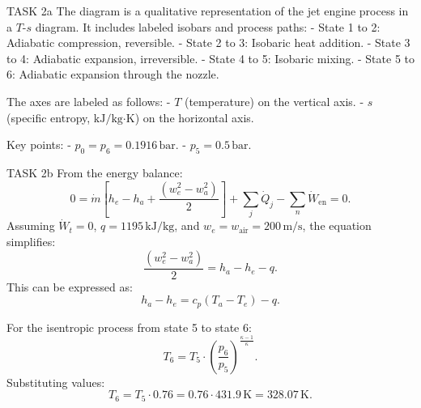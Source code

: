 TASK 2a  
The diagram is a qualitative representation of the jet engine process in a \( T \)-\( s \) diagram. It includes labeled isobars and process paths:  
- State 1 to 2: Adiabatic compression, reversible.  
- State 2 to 3: Isobaric heat addition.  
- State 3 to 4: Adiabatic expansion, irreversible.  
- State 4 to 5: Isobaric mixing.  
- State 5 to 6: Adiabatic expansion through the nozzle.  

The axes are labeled as follows:  
- \( T \) (temperature) on the vertical axis.  
- \( s \) (specific entropy, \( \text{kJ}/\text{kg·K} \)) on the horizontal axis.  

Key points:  
- \( p_0 = p_6 = 0.1916 \, \text{bar} \).  
- \( p_5 = 0.5 \, \text{bar} \).  

TASK 2b  
From the energy balance:  
\[
0 = \dot{m} \left[ h_e - h_a + \frac{(w_e^2 - w_a^2)}{2} \right] + \sum_j \dot{Q}_j - \sum_n \dot{W}_{\text{en}} = 0.
\]  
Assuming \( \dot{W}_t = 0 \), \( q = 1195 \, \text{kJ/kg} \), and \( w_e = w_{\text{air}} = 200 \, \text{m/s} \), the equation simplifies:  
\[
\frac{(w_e^2 - w_a^2)}{2} = h_a - h_e - q.
\]  
This can be expressed as:  
\[
h_a - h_e = c_p (T_a - T_e) - q.
\]  

For the isentropic process from state 5 to state 6:  
\[
T_6 = T_5 \cdot \left( \frac{p_6}{p_5} \right)^{\frac{\kappa - 1}{\kappa}}.
\]  
Substituting values:  
\[
T_6 = T_5 \cdot 0.76 = 0.76 \cdot 431.9 \, \text{K} = 328.07 \, \text{K}.
\]